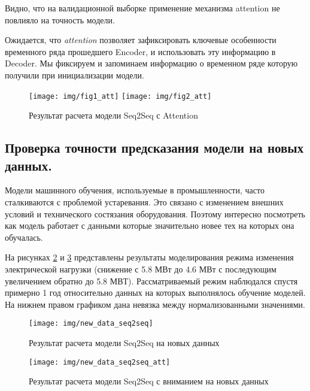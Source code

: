 \documentclass[12pt,a4paper]{article}
\begin{document}
Видно, что на валидационной выборке применение механизма attention не повлияло на точность модели.

Ожидается, что {\it attention} позволяет зафиксировать ключевые особенности временного ряда прошедшего Encoder, и использовать эту информацию в Decoder. Мы фиксируем и запоминаем информацию о временном ряде которую получили при инициализации модели.


\begin{figure}[htb]
	\centering\texttt{[image: img/fig1\_att]}
	\centering\texttt{[image: img/fig2\_att]}
	\caption{Результат расчета модели Seq2Seq с Attention}
	\label{fig:res_att}
\end{figure}

\subsection{Проверка точности предсказания модели на новых данных.}

Модели машинного обучения, используемые в промышленности, часто сталкиваются с проблемой устаревания. Это связано с изменением внешних условий и технического состязания оборудования. Поэтому интересно посмотреть как модель работает с данными которые значительно новее тех на которых она обучалась.


На рисунках \ref{fig:new_data_seq2seq} и \ref{fig:new_data_seq2seq_att} представлены результаты моделирования режима изменения электрической нагрузки (снижение с 5.8 МВт до 4.6 МВт с последующим увеличением обратно до 5.8 МВТ). Рассматриваемый режим наблюдался спустя примерно 1 год относительно данных на которых выполнялось обучение моделей. На нижнем правом графиком дана невязка между нормализованными значениями.

\begin{figure}[htbp]
	\centering\texttt{[image: img/new\_data\_seq2seq]}
	\caption{Результат расчета модели Seq2Seq на новых данных}
	\label{fig:new_data_seq2seq}
\end{figure}

\begin{figure}[htbp]
	\centering\texttt{[image: img/new\_data\_seq2seq\_att]}
	\caption{Результат расчета модели Seq2Seq с вниманием на новых данных}
	\label{fig:new_data_seq2seq_att}
\end{figure}
\end{document}
